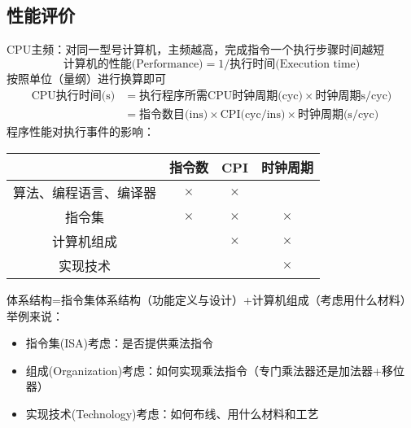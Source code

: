 \subsection{性能评价}
\label{subsec:performance}
CPU主频：对同一型号计算机，主频越高，完成指令一个执行步骤时间越短
\[\text{计算机的性能(Performance)}=1/\text{执行时间(Execution time)}\]
按照单位（量纲）进行换算即可
\[\begin{aligned}
\text{CPU执行时间(s)}&=\text{执行程序所需CPU时钟周期(cyc)}\times\text{时钟周期s/cyc)}\\
&=\text{指令数目(ins)}\times\text{CPI(cyc/ins)}\times\text{时钟周期(s/cyc)}
\end{aligned}\]
程序性能对执行事件的影响：
\begin{center}
\begin{tabular}{|c|c|c|c|}\hline
 & 指令数 & CPI & 时钟周期\\\hline
算法、编程语言、编译器 & $\times$ & $\times$ & \\\hline
指令集 & $\times$ & $\times$ & $\times$ \\\hline
计算机组成 & & $\times$ & $\times$ \\\hline
实现技术 & & & $\times$\\\hline
\end{tabular}
\end{center}
体系结构=指令集体系结构（功能定义与设计）+计算机组成（考虑用什么材料）\\
举例来说：
\begin{itemize}
	\item 指令集(ISA)考虑：是否提供乘法指令
	\item 组成(Organization)考虑：如何实现乘法指令（专门乘法器还是加法器+移位器）
	\item 实现技术(Technology)考虑：如何布线、用什么材料和工艺
\end{itemize}

